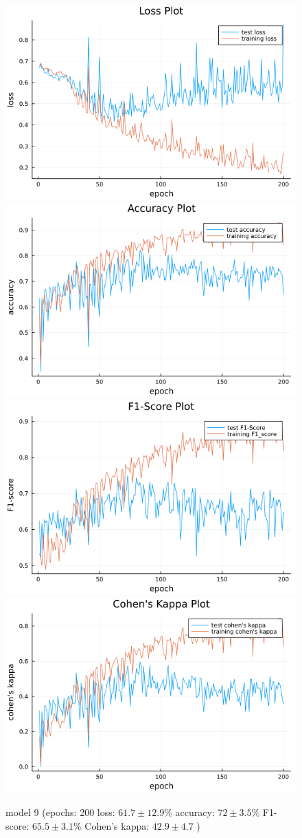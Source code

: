\documentclass[
a4paper, 
12pt,
grayscalebody, %
abstract=on,
twoside, BCOR10mm, 12pt, DIV13,headinclude, footexclude, final, abstracton, openright
]{ibireprt}
\numberwithin{equation}{chapter}
\numberwithin{table}{chapter}
\numberwithin{figure}{chapter}
\numberwithin{algorithm}{chapter}
\numberwithin{example}{chapter}
\numberwithin{example}{chapter}
\begin{document}
\begin{figure}
	\includegraphics[width=0.4\linewidth]{loss_png_13_3.png}\hfill
	\includegraphics[width=0.4\linewidth]{accuracy_png_13_3.png}
	\\[\smallskipamount]
	\includegraphics[width=0.4\linewidth]{f1_score_png_13_3.png}\hfill
	\includegraphics[width=0.4\linewidth]{cohens_kappa_png_13_3.png}
	\caption{model 9 (epochs: 200 loss: $61.7\pm12.9\% $ accuracy: $72\pm3.5\%$ F1-score: $65.5\pm3.1\%$  Cohen's kappa: $42.9\pm4.7$ )}
	\label{fig:model_9_200}
\end{figure}
\end{document}
